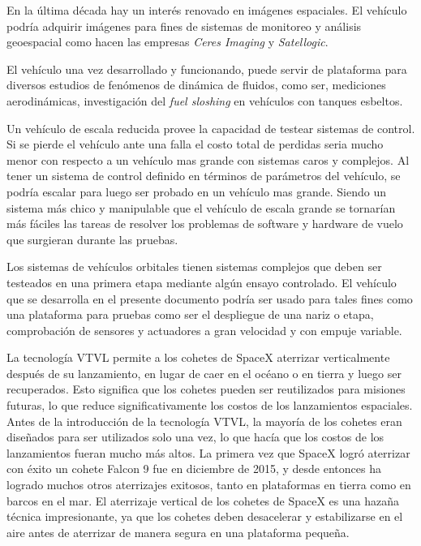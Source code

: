 \medskip

En la última década hay un interés renovado en imágenes espaciales. El vehículo podría adquirir imágenes para fines de sistemas de monitoreo y análisis geoespacial como hacen las empresas \textit{Ceres Imaging} y \textit{Satellogic}. %

\medskip

El vehículo una vez desarrollado y funcionando, puede servir de plataforma para diversos
estudios de fenómenos de dinámica de fluidos, como ser, mediciones aerodinámicas,
investigación del \textit{fuel sloshing} en vehículos con tanques esbeltos.

\medskip

Un vehículo de escala reducida provee la capacidad de testear sistemas de control. Si se pierde el vehículo ante una falla el costo total de perdidas seria mucho menor con respecto a un vehículo mas grande con sistemas caros y complejos. Al tener un sistema de control definido en términos de parámetros del vehículo, se podría escalar para luego ser probado en un vehículo mas grande. Siendo un sistema más chico y manipulable que el vehículo de escala grande se tornarían más fáciles las tareas de resolver los problemas de software y hardware de vuelo que surgieran durante las pruebas.

\medskip


Los sistemas de vehículos orbitales tienen sistemas complejos que deben ser testeados en una primera etapa mediante algún ensayo controlado. El vehículo que se desarrolla en el presente documento podría ser usado para tales fines como una plataforma para pruebas como ser el despliegue de una nariz o etapa, comprobación de sensores y actuadores a gran velocidad y con empuje variable.

\medskip

La tecnología VTVL permite a los cohetes de SpaceX aterrizar verticalmente después de su lanzamiento, en lugar de caer en el océano o en tierra y luego ser recuperados. Esto significa que los cohetes pueden ser reutilizados para misiones futuras, lo que reduce significativamente los costos de los lanzamientos espaciales. Antes de la introducción de la tecnología VTVL, la mayoría de los cohetes eran diseñados para ser utilizados solo una vez, lo que hacía que los costos de los lanzamientos fueran mucho más altos.
La primera vez que SpaceX logró aterrizar con éxito un cohete Falcon 9 fue en diciembre de 2015, y desde entonces ha logrado muchos otros aterrizajes exitosos, tanto en plataformas en tierra como en barcos en el mar. El aterrizaje vertical de los cohetes de SpaceX es una hazaña técnica impresionante, ya que los cohetes deben desacelerar y estabilizarse en el aire antes de aterrizar de manera segura en una plataforma pequeña.


